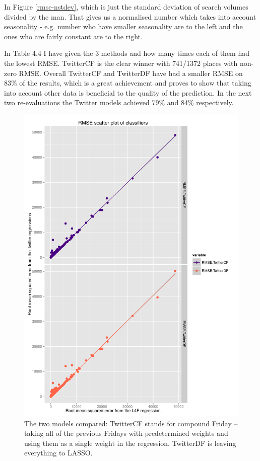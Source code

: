 \documentclass[minf,twoside,singlespacing,parskip,frontabs,notimes,11pt]{infthesis}
\begin{document}
In Figure \ref{rmse-nstdev}, which is just the standard deviation of search volumes divided by the man. That gives us a normalised number which takes into account seasonality - e.g. number who have smaller seasonality are to the left and the ones who are fairly constant are to the right. 

In Table 4.4 I have given the 3 methods and how many times each of them had the lowest RMSE. TwitterCF is the clear winner with 741/1372 places with non-zero RMSE. Overall TwitterCF and TwitterDF have had a smaller RMSE on 83\% of the results, which is a great achievement and proves to show that taking into account other data is beneficial to the quality of the prediction. In the next two re-evaluations the Twitter models achieved 79\% and 84\% respectively. 


\begin{figure}[]
\begin{center}
\includegraphics[scale=0.75]{rmse_scatter_by_reg}
\end{center}
\caption{The two models compared: TwitterCF stands for compound Friday -- taking all of the previous Fridays with predetermined weights and using them as a single weight in the regression. TwitterDF is leaving everything to LASSO.}
\label{rmse_scatter_by_reg}
\end{figure}
\end{document}
